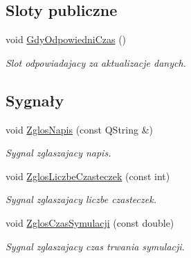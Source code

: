 \subsection*{Sloty publiczne}
\begin{DoxyCompactItemize}
\item 
void \hyperlink{class_zbiornik_aa07ceb0fcbf307f0aa1eb75c32f3f47e}{Gdy\+Odpowiedni\+Czas} ()
\begin{DoxyCompactList}\small\item\em Slot odpowiadajacy za aktualizacje danych. \end{DoxyCompactList}\end{DoxyCompactItemize}
\subsection*{Sygnały}
\begin{DoxyCompactItemize}
\item 
void \hyperlink{class_zbiornik_a2d92e4a46f9a5dda37ddd9948046580b}{Zglos\+Napis} (const Q\+String \&)
\begin{DoxyCompactList}\small\item\em Sygnal zglaszajacy napis. \end{DoxyCompactList}\item 
void \hyperlink{class_zbiornik_ad200a7e5bc038ad94131d1a354266889}{Zglos\+Liczbe\+Czasteczek} (const int)
\begin{DoxyCompactList}\small\item\em Sygnal zglaszajacy liczbe czasteczek. \end{DoxyCompactList}\item 
void \hyperlink{class_zbiornik_a96b9ee7d80fc0f29787dc060027d2805}{Zglos\+Czas\+Symulacji} (const double)
\begin{DoxyCompactList}\small\item\em Sygnal zglaszajacy czas trwania symulacji. \end{DoxyCompactList}\end{DoxyCompactItemize}
